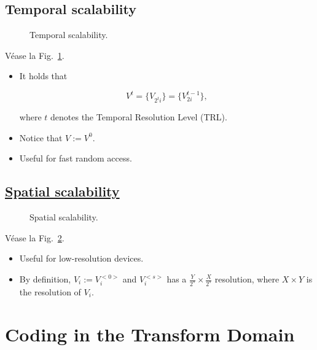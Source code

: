 \subsection{Temporal scalability}
\begin{figure}
  \caption{Temporal scalability.}
  \label{fig:temporal-scalability}
\end{figure}

Véase la Fig.~\ref{fig:temporal-scalability}.

\begin{itemize}
\item
  It holds that

  \begin{equation}
    V^{t}=\{V_{2^t i}\}=\{V_{2i}^{t-1}\},
  \end{equation}

  where $t$ denotes the Temporal Resolution Level (TRL).
\item
  Notice that $V:=V^{0}$.
\item
  Useful for fast random access.
\end{itemize}

%
%

\subsection{\href{http://inst.eecs.berkeley.edu/~ee290t/sp04/lectures/videowavelet_UCB1-3.pdf}{Spatial scalability}}

\begin{figure}
  \caption{Spatial scalability.}
  \label{fig:spatial-scalability}
\end{figure}

Véase la Fig.~\ref{fig:spatial-scalability}.

\begin{itemize}
\item
  Useful for low-resolution devices.
\item
  By definition, $V_i:=V_i^{<0>}$ and $V_i^{<s>}$ has a
  $\frac{Y}{2^s}\times \frac{X}{2^s}$ resolution, where $X\times Y$
  is the resolution of $V_i$.
\end{itemize}

\section{Coding in the Transform Domain}


